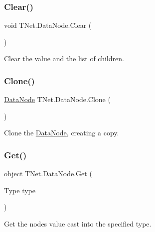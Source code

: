 \subsubsection{\texorpdfstring{Clear()}{Clear()}}
{\footnotesize\ttfamily void T\+Net.\+Data\+Node.\+Clear (\begin{DoxyParamCaption}{ }\end{DoxyParamCaption})}



Clear the value and the list of children. 

\mbox{\label{class_t_net_1_1_data_node_ab1e844adb5b3c40e3a1b62519045ca45}} 
\subsubsection{\texorpdfstring{Clone()}{Clone()}}
{\footnotesize\ttfamily \mbox{\hyperlink{class_t_net_1_1_data_node}{Data\+Node}} T\+Net.\+Data\+Node.\+Clone (\begin{DoxyParamCaption}{ }\end{DoxyParamCaption})}



Clone the \mbox{\hyperlink{class_t_net_1_1_data_node}{Data\+Node}}, creating a copy. 

\mbox{\label{class_t_net_1_1_data_node_a8118d9feb33d0db66367d8dd9629ae6f}} 
\subsubsection{\texorpdfstring{Get()}{Get()}}
{\footnotesize\ttfamily object T\+Net.\+Data\+Node.\+Get (\begin{DoxyParamCaption}\item[{Type}]{type }\end{DoxyParamCaption})}



Get the node\textquotesingle{}s value cast into the specified type. 

\mbox{\label{class_t_net_1_1_data_node_a5255fbb293b4743c2cd4410f8d288353}} 
